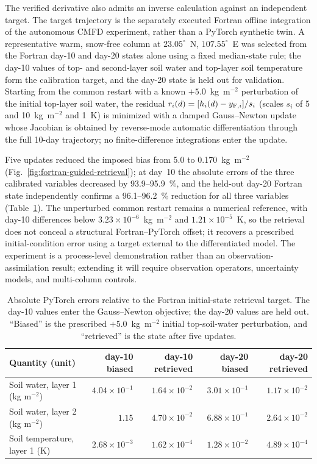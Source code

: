 The verified derivative also admits an inverse calculation against an
independent target. The target trajectory is the separately executed Fortran
offline integration of the autonomous CMFD experiment, rather than a PyTorch
synthetic twin. A representative warm, snow-free column at
$23.05^\circ$~N, $107.55^\circ$~E was selected from the Fortran day-10 and
day-20 states alone using a fixed median-state rule; the day-10 values of
top- and second-layer soil water and top-layer soil temperature form the
calibration target, and the day-20 state is held out for validation.
Starting from the common restart with a known $+5.0$~kg~m$^{-2}$
perturbation of the initial top-layer soil water, the residual
$r_i(d)=[h_i(d)-y_{{\rm F},i}]/s_i$ (scales $s_i$ of 5 and
10~kg~m$^{-2}$ and 1~K) is minimized with a damped Gauss--Newton update whose
Jacobian is obtained by reverse-mode automatic differentiation through the
full 10-day trajectory; no finite-difference integrations enter the update.

Five updates reduced the imposed bias from 5.0 to 0.170~kg~m$^{-2}$
(Fig.~\ref{fig:fortran-guided-retrieval}); at day~10 the absolute errors of
the three calibrated variables decreased by 93.9--95.9~\%, and the held-out
day-20 Fortran state independently confirms a 96.1--96.2~\% reduction for all
three variables (Table~\ref{tab:fortran-guided-retrieval}). The unperturbed
common restart remains a numerical reference, with day-10 differences below
$3.23\times10^{-6}$~kg~m$^{-2}$ and $1.21\times10^{-5}$~K, so the retrieval
does not conceal a structural Fortran--PyTorch offset; it recovers a
prescribed initial-condition error using a target external to the
differentiated model. The experiment is a process-level demonstration rather
than an observation-assimilation result; extending it will require observation
operators, uncertainty models, and multi-column controls.

\begin{table}[H]
\caption{Absolute PyTorch errors relative to the Fortran initial-state
retrieval target. The day-10 values enter the Gauss--Newton objective; the
day-20 values are held out. ``Biased'' is the prescribed $+5.0$~kg~m$^{-2}$
initial top-soil-water perturbation, and ``retrieved'' is the state after five
updates.}
\label{tab:fortran-guided-retrieval}
\centering
\small
\begin{tabular}{lrrrr}
\hline
Quantity (unit) & day-10 biased & day-10 retrieved & day-20 biased & day-20 retrieved \\
\hline
Soil water, layer 1 (kg m$^{-2}$) & $4.04\times10^{-1}$ & $1.64\times10^{-2}$ & $3.01\times10^{-1}$ & $1.17\times10^{-2}$ \\
Soil water, layer 2 (kg m$^{-2}$) & $1.15$ & $4.70\times10^{-2}$ & $6.88\times10^{-1}$ & $2.64\times10^{-2}$ \\
Soil temperature, layer 1 (K) & $2.68\times10^{-3}$ & $1.62\times10^{-4}$ & $1.28\times10^{-2}$ & $4.89\times10^{-4}$ \\
\hline
\end{tabular}
\end{table}


